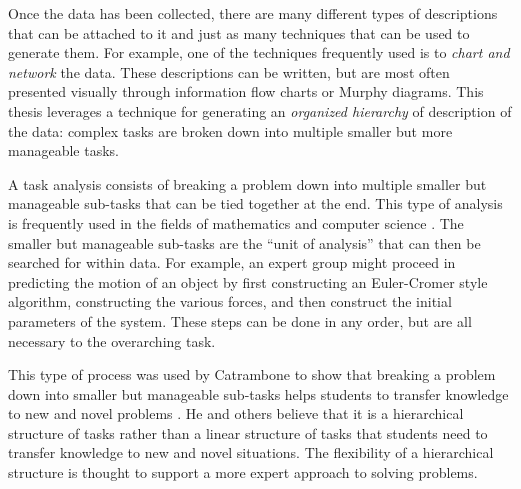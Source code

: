 \documentclass{msuphddissertation}
\begin{document}
\begin{doublespace}
Once the data has been collected, there are many different types of descriptions that can be attached to it and just as many techniques that can be used to generate them.  For example, one of the techniques frequently used is to \textit{chart and network} the data.  These descriptions can be written, but are most often presented visually through information flow charts or Murphy diagrams.  This thesis leverages a technique for generating an \textit{organized hierarchy} of description of the data: complex tasks are broken down into multiple smaller but more manageable tasks.


A task analysis consists of breaking a problem down into multiple smaller but manageable sub-tasks that can be tied together at the end.  This type of analysis is frequently used in the fields of mathematics and computer science \cite{Catrambone1998,Chandra1990,Fitzgerald2008,Ahmadzedah2005}.  The smaller but manageable sub-tasks are the ``unit of analysis'' that can then be searched for within data.  For example, an expert group might proceed in predicting the motion of an object by first constructing an Euler-Cromer style algorithm, constructing the various forces, and then construct the initial parameters of the system.  These steps can be done in any order, but are all necessary to the overarching task.

This type of process was used by Catrambone to show that breaking a problem down into smaller but manageable sub-tasks helps students to transfer knowledge to new and novel problems \cite{Catrambone1998}.  He and others believe that it is a hierarchical structure of tasks rather than a linear structure of tasks that students need to transfer knowledge to new and novel situations.  The flexibility of a hierarchical structure is thought to support a more expert approach to solving problems.


\end{doublespace}
\end{document}
